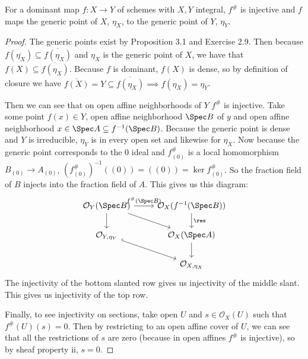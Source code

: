 \begin{lem}\label{lem:dominant_map}
	For a dominant map $f: X\to Y $ of schemes with $X,Y $ integral, $f^\#$ is injective and $f $ maps the generic point of $X $, $\eta _X $, to the generic point of $Y $, $\eta _Y $.
\end{lem}
\begin{proof}
	The generic points exist by Proposition 3.1 and Exercise 2.9.
	Then because $f(\overline{\eta _X}) \subseteq \overline{f(\eta _X)}   $ and $\eta _X $ is the generic point of $X $, we have that $f(X) \subseteq \overline{f(\eta_X)}  $.
	Because $f  $ is dominant, $f(X) $ is dense, so by definition of closure we have $\overline{f(X)} = Y \subseteq \overline{f(\eta _X)} \implies f(\eta_X) = \eta_Y$.

	Then we can see that on open affine neighborhoods of $Y $ $f^\# $ is injective.
	Take some point $f(x) \in Y $, open affine neighborhood $\Spec B $ of $y $ and open affine neighborhood $x \in \Spec A \subseteq f^{-1}(\Spec B)$.
	Because the generic point is dense and $Y $ is irreducible, $\eta _Y $ is in every open set and likewise for $\eta _X $.
	Now because the generic point corresponds to the 0 ideal and $f^\#_{(0)} $ is a local homomorphism $B_{(0)}\to A_{(0)} $, $(f^\#_{(0)})^{-1}((0)) = ((0)) = \ker f^\#_{(0)} $.
	So the fraction field of $B $ injects into the fraction field of $A $.
	This gives us this diagram:
\[\begin{tikzcd}
	{\mathcal{O}_Y(\Spec B)} & {\mathcal{O}_X(f^{-1}(\Spec B))} \\
	{\mathcal{O}_{Y,\eta_Y}} & {\mathcal{O}_X(\Spec A)} \\
	& {\mathcal{O}_{X,\eta_X}}
	\arrow["{f^\#(\Spec B)}", from=1-1, to=1-2]
	\arrow[from=1-1, to=2-1]
	\arrow[from=1-1, to=2-2]
	\arrow["\res", from=1-2, to=2-2]
	\arrow[hook, from=2-1, to=3-2]
	\arrow[from=2-2, to=3-2]
\end{tikzcd}\]
	The injectivity of the bottom slanted row gives us injectivity of the middle slant.
	This gives us injectivity of the top row.

	Finally, to see injectivity on sections, take open $U $ and $s \in \mathcal{O}_X(U) $ such that $f^\#(U)(s) = 0 $.
	Then by restricting to an open affine cover of $U $, we can see that all the restrictions of $s$ are zero (because in open affines $f^\# $ is injective), so by sheaf property ii, $s = 0$.
\end{proof}

